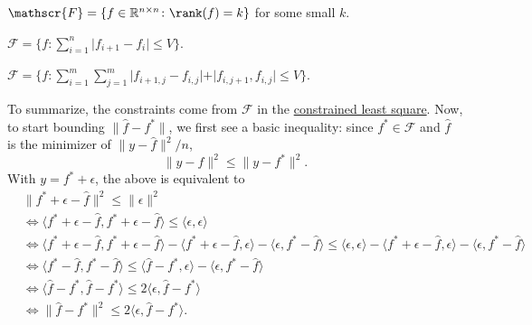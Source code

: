 \begin{eg}
	\(\mathscr{F} = \{f \in \mathbb{R} ^{n \times n} \colon \rank (f) = k \} \) for some small \(k\).
\end{eg}

\begin{eg}
	\(\mathscr{F} = \{f \colon \sum_{i = 1}^n \vert f_{i+1} - f_i \vert \leq V \} \).
\end{eg}

\begin{eg}
	\(\mathscr{F} = \{f \colon \sum_{i=1}^{m} \sum_{j=1}^{m} \vert f_{i+1, j} - f_{i, j} \vert + \vert f_{i, j+1} , f_{i, j} \vert \leq V \} \).
\end{eg}

To summarize, the constraints come from \(\mathscr{F} \) in the \hyperref[prb:constrained-LS]{constrained least square}. Now, to start bounding \(\lVert \hat{f} - f^{\ast} \rVert \), we first see a basic inequality: since \(f^{\ast} \in \mathscr{F} \) and \(\hat{f} \) is the minimizer of \(\lVert y - \hat{f} \rVert ^2 / n \),
\[
	\lVert y - \hat{f} \rVert ^2 \leq \lVert y - f^{\ast} \rVert ^2.
\]
With \(y = f^{\ast} + \epsilon \), the above is equivalent to
\[
	\begin{split}
		 & \lVert f^{\ast} + \epsilon - \hat{f}  \rVert ^2 \leq \lVert \epsilon \rVert ^2                                                                                                                                                                                                                                                                  \\
		 & \iff \langle f^{\ast} + \epsilon - \hat{f} , f^{\ast} + \epsilon - \hat{f} \rangle \leq \langle \epsilon , \epsilon \rangle                                                                                                                                                                                                                     \\
		 & \iff \langle f^{\ast} + \epsilon - \hat{f} , f^{\ast} + \epsilon - \hat{f} \rangle - \langle f^{\ast} + \epsilon - \hat{f}, \epsilon \rangle - \langle \epsilon , f^{\ast} - \hat{f} \rangle \leq \langle \epsilon , \epsilon \rangle - \langle f^{\ast} + \epsilon - \hat{f}, \epsilon \rangle - \langle \epsilon , f^{\ast} - \hat{f} \rangle \\
		 & \iff \langle f^{\ast} - \hat{f} , f^{\ast} - \hat{f} \rangle \leq \langle \hat{f} - f^{\ast} , \epsilon \rangle - \langle \epsilon , f^{\ast} - \hat{f} \rangle                                                                                                                                                                                 \\
		 & \iff \langle \hat{f} - f^{\ast} , \hat{f} - f^{\ast} \rangle \leq 2 \langle \epsilon , \hat{f} - f^{\ast} \rangle                                                                                                                                                                                                                               \\
		 & \iff \lVert \hat{f} - f^{\ast}  \rVert ^2 \leq 2 \langle \epsilon , \hat{f} - f^{\ast}  \rangle .
	\end{split}
\]
